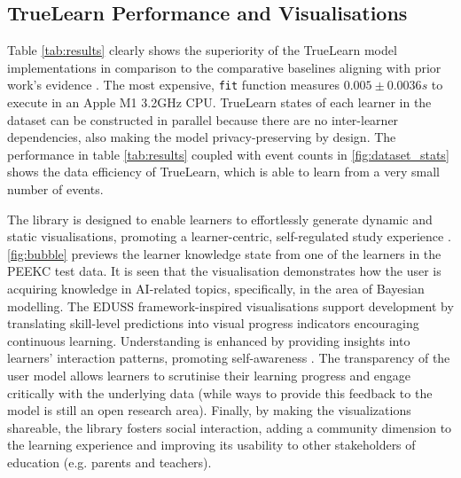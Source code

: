 \documentclass[letterpaper]{article} %
\begin{document}
\subsection{TrueLearn Performance and Visualisations}

Table \ref{tab:results} clearly shows the superiority of the TrueLearn model implementations in comparison to the comparative baselines aligning with prior work's evidence \cite{bulathwela2022sus}. The most expensive, \verb|fit| function measures $0.005\pm0.0036s$ to execute in an Apple M1 3.2GHz CPU. TrueLearn states of each learner in the dataset can be constructed in parallel because there are no inter-learner dependencies, also making the model privacy-preserving by design. The performance in table \ref{tab:results} coupled with event counts in \figurename{ \ref{fig:dataset_stats}} shows the data efficiency of TrueLearn, which is able to learn from a very small number of events.  

The library is designed to enable learners to effortlessly generate dynamic and static visualisations, promoting a learner-centric, self-regulated study experience \cite{bull2008metacognition}. \figurename{ \ref{fig:bubble}} previews the learner knowledge state from one of the learners in the PEEKC test data. It is seen that the visualisation demonstrates how the user is acquiring knowledge in AI-related topics, specifically, in the area of Bayesian modelling. 
The EDUSS framework-inspired visualisations support development by translating skill-level predictions into visual progress indicators encouraging continuous learning. Understanding is enhanced by providing insights into learners' interaction patterns, promoting self-awareness \cite{mti6060042}. The transparency of the user model allows learners to scrutinise their learning progress and engage critically with the underlying data (while ways to provide this feedback to the model is still an open research area). Finally, by making the visualizations shareable, the library fosters social interaction, adding a community dimension to the learning experience and improving its usability to other stakeholders of education (e.g. parents and teachers).
\end{document}
